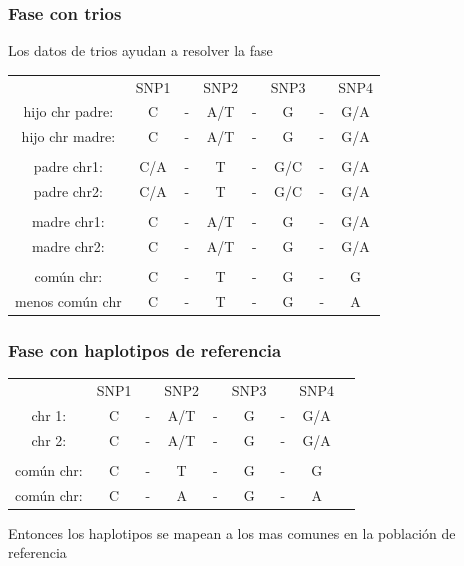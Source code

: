 \documentclass{beamer}\usepackage[]{graphicx}\usepackage[]{color}
\begin{document}
\begin{frame}
\frametitle{Fase con trios}
Los datos de trios ayudan a resolver la fase
\begin{table}[]
\centering
\begin{tabular}{cccccccc}
      &SNP1& &SNP2 & & SNP3 & & SNP4\\
hijo chr padre: &C   &-&  A/T&-& G &-& G/A\\
hijo chr madre: &C   &-&  A/T&-& G &-& G/A\\ 
& & & &\\
padre chr1: &C/A   &-&  T&-& G/C &-& G/A\\
padre chr2: &C/A   &-&  T&-& G/C &-& G/A\\ 
& & & &\\
madre chr1: &C   &-&  A/T&-& G &-& G/A \\
madre chr2: &C   &-&  A/T&-& G &-& G/A\\ 
& & & &\\
com\'un chr: & C  &-&  T &-& G &-& G\\
menos com\'un chr & C  &-&  T &-& G &-& A\\

\end{tabular}

\end{table}
\end{frame}



\begin{frame}
\frametitle{Fase con haplotipos de referencia}
\begin{table}[]
\centering
\begin{tabular}{ccccccccc}
      &SNP1& &SNP2 & & SNP3 & & SNP4\\
chr 1: &C   &-&  A/T&-& G &-& G/A\\
chr 2: &C   &-&  A/T&-& G &-& G/A\\ 
& & & &\\
com\'un chr: & C  &-&  T &-& G &-& G\\
com\'un chr: & C  &-&  A &-& G &-& A\\
\end{tabular}
Entonces los haplotipos se mapean a los mas comunes en la poblaci\'on de referencia
\end{table}
\end{frame}
\end{document}
